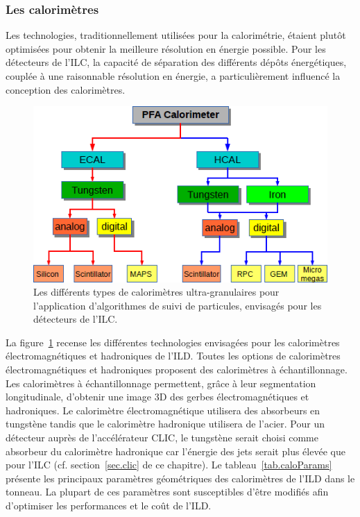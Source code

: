 \subsubsection{Les calorimètres}
Les technologies, traditionnellement utilisées pour la calorimétrie, étaient plutôt optimisées pour obtenir la meilleure résolution en énergie possible. Pour les détecteurs de l'ILC, la capacité de séparation des différents dépôts énergétiques, couplée à une raisonnable résolution en énergie, a particulièrement influencé la conception des calorimètres. 
\begin{figure}[!h]
  \begin{center}
    \includegraphics[width=.7\textwidth]{ILC/figs/pfaCalo.png}
    \caption{Les différents types de calorimètres ultra-granulaires pour l'application d'algorithmes de suivi de particules, envisagés pour les détecteurs de l'ILC.}
    \label{fig:calopfa}
  \end{center}
\end{figure}
La figure~\ref{fig:calopfa} recense les différentes technologies envisagées pour les calorimètres électromagnétiques et hadroniques de l'ILD. Toutes les options de calorimètres électromagnétiques et hadroniques proposent des calorimètres à échantillonnage. Les calorimètres à échantillonnage permettent, grâce à leur segmentation longitudinale, d'obtenir une image 3D des gerbes électromagnétiques et hadroniques. Le calorimètre électromagnétique utilisera des absorbeurs en tungstène tandis que le calorimètre hadronique utilisera de l'acier. Pour un détecteur auprès de l'accélérateur CLIC, le tungstène serait choisi comme absorbeur du calorimètre hadronique car l'énergie des jets serait plus élevée que pour l'ILC (cf. section~\ref{sec.clic} de ce chapitre). Le tableau~\ref{tab.caloParams} présente les principaux paramètres géométriques des calorimètres de l'ILD dans le tonneau. La plupart de ces paramètres sont susceptibles d'être modifiés afin d'optimiser les performances et le coût de l'ILD.
